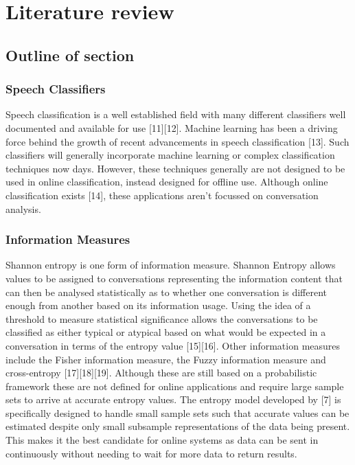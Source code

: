 
\chapter{Literature review}

\section{Outline of section}

\subsection{Speech Classifiers}
Speech classification is a well established field with many different classifiers well documented and available for use [11][12]. Machine learning has been a driving force behind the growth of recent advancements in speech classification [13]. Such classifiers will generally incorporate machine learning or complex classification techniques now days. However, these techniques generally are not designed to be used in online classification, instead designed for offline use. Although online classification exists [14], these applications aren't focussed on conversation analysis. 

\subsection{Information Measures}
Shannon entropy is one form of information measure. Shannon Entropy allows values to be assigned to conversations representing the information content that can then be analysed statistically as to whether one conversation is different enough from another based on its information usage. Using the idea of a threshold to measure statistical significance allows the conversations to be classified as either typical or atypical based on what would be expected in a conversation in terms of the entropy value [15][16]. Other information measures include the Fisher information measure, the Fuzzy information measure and cross-entropy [17][18][19].  Although these are still based on a probabilistic framework these are not defined for online applications and require large sample sets to arrive at accurate entropy values. The entropy model developed by [7] is specifically designed to handle small sample sets such that accurate values can be estimated despite only small subsample representations of the data being present. This makes it the best candidate for online systems as data can be sent in continuously without needing to wait for more data to return results.

